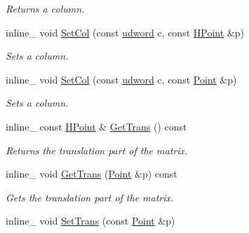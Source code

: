 \begin{DoxyCompactItemize}
\begin{DoxyCompactList}\small\item\em Returns a column. \end{DoxyCompactList}\item 
inline\+\_\+ void \hyperlink{classMatrix4x4_aac77ac4153ba1ddfc369bd93daeade2b}{Set\+Col} (const \hyperlink{IceTypes_8h_a44c6f1920ba5551225fb534f9d1a1733}{udword} c, const \hyperlink{classHPoint}{H\+Point} \&p)\hypertarget{classMatrix4x4_aac77ac4153ba1ddfc369bd93daeade2b}{}\label{classMatrix4x4_aac77ac4153ba1ddfc369bd93daeade2b}

\begin{DoxyCompactList}\small\item\em Sets a column. \end{DoxyCompactList}\item 
inline\+\_\+ void \hyperlink{classMatrix4x4_a8bb482e1520341e88d505698a6cdbb9e}{Set\+Col} (const \hyperlink{IceTypes_8h_a44c6f1920ba5551225fb534f9d1a1733}{udword} c, const \hyperlink{classPoint}{Point} \&p)\hypertarget{classMatrix4x4_a8bb482e1520341e88d505698a6cdbb9e}{}\label{classMatrix4x4_a8bb482e1520341e88d505698a6cdbb9e}

\begin{DoxyCompactList}\small\item\em Sets a column. \end{DoxyCompactList}\item 
inline\+\_\+ const \hyperlink{classHPoint}{H\+Point} \& \hyperlink{classMatrix4x4_ab4fc37881fcbff8e7338a6ee88530fe3}{Get\+Trans} () const \hypertarget{classMatrix4x4_ab4fc37881fcbff8e7338a6ee88530fe3}{}\label{classMatrix4x4_ab4fc37881fcbff8e7338a6ee88530fe3}

\begin{DoxyCompactList}\small\item\em Returns the translation part of the matrix. \end{DoxyCompactList}\item 
inline\+\_\+ void \hyperlink{classMatrix4x4_a7850e5ba38a89cfcc9f4aae4c1108b37}{Get\+Trans} (\hyperlink{classPoint}{Point} \&p) const \hypertarget{classMatrix4x4_a7850e5ba38a89cfcc9f4aae4c1108b37}{}\label{classMatrix4x4_a7850e5ba38a89cfcc9f4aae4c1108b37}

\begin{DoxyCompactList}\small\item\em Gets the translation part of the matrix. \end{DoxyCompactList}\item 
inline\+\_\+ void \hyperlink{classMatrix4x4_a6baf0a4d55ed572366ecc2d8022798a0}{Set\+Trans} (const \hyperlink{classPoint}{Point} \&p)\hypertarget{classMatrix4x4_a6baf0a4d55ed572366ecc2d8022798a0}{}\label{classMatrix4x4_a6baf0a4d55ed572366ecc2d8022798a0}


\end{DoxyCompactItemize}
